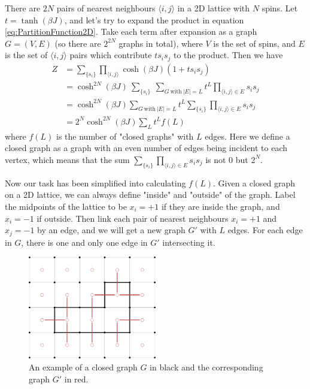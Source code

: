 \documentclass[11pt]{article}
\begin{document}
	There are $2N$ pairs of nearest neighbours $\langle i,j \rangle$ in a 2D lattice with $N$ spins. Let $t = \tanh(\beta J)$, and let's try to expand the product in equation \eqref{eq:PartitionFunction2D}. Take each term after expansion as a graph $G = (V, E)$ (so there are $2^{2N}$ graphs in total), where $V$ is the set of spins, and $E$ is the set of $\langle i,j \rangle$ pairs which contribute $t s_i s_j$ to the product. Then we have
	\begin{equation} \label{eq:PartitionFunction2DTransformed}
		\begin{aligned}
			Z &= \sum_{\{s_i\}} \prod_{\langle i,j \rangle} \cosh(\beta J)(1 + t s_i s_j) \\
			&= \cosh^{2N}(\beta J)\ \sum_{\{s_i\}}\ \sum_{G\ \text{with}\ |E|=L} t^L \prod_{\langle i,j \rangle \in E} s_i s_j \\
			&= \cosh^{2N}(\beta J) \sum_{G\ \text{with}\ |E|=L} t^L \sum_{\{s_i\}} \prod_{\langle i,j \rangle \in E} s_i s_j \\
			&= 2^N \cosh^{2N}(\beta J) \sum_{L} t^L f(L)
		\end{aligned}
	\end{equation}
	where $f(L)$ is the number of "closed graphs" with $L$ edges. Here we define a closed graph as a graph with an even number of edges being incident to each vertex, which means that the sum $\sum_{\{s_i\}} \prod_{\langle i,j \rangle \in E} s_i s_j$ is not $0$ but $2^N$.

	Now our task has been simplified into calculating $f(L)$. Given a closed graph on a 2D lattice, we can always define "inside" and "outside" of the graph. Label the midpoints of the lattice to be $x_i=+1$ if they are inside the graph, and $x_i=-1$ if outside. Then link each pair of nearest neighbours $x_i=+1$ and $x_j=-1$ by an edge, and we will get a new graph $G'$ with $L$ edges. For each edge in $G$, there is one and only one edge in $G'$ intersecting it.

	\begin{figure}[H]
		\begin{center}
			\includegraphics[width=0.5\textwidth]{./img/ising-graph.png}
		\end{center}
		\caption{An example of a closed graph $G$ in black and the corresponding graph $G'$ in red.}
		\label{fig:ising_graph}
	\end{figure}
\end{document}
